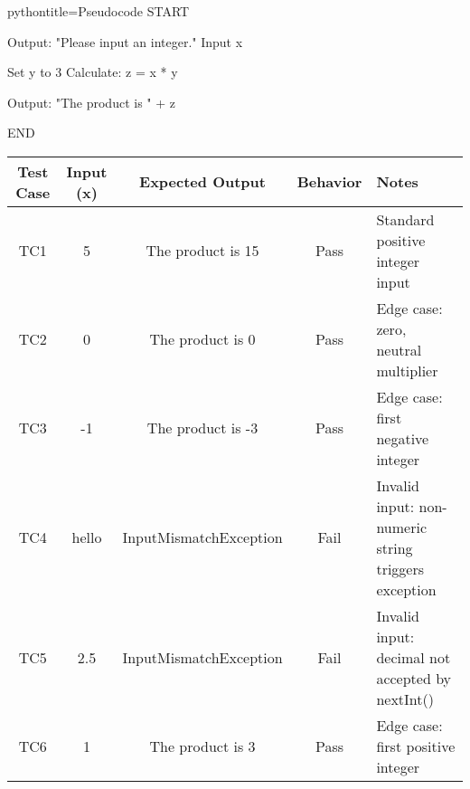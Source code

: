 
\newpage

\begin{NxCodeBox}{python}{title={Pseudocode}}
START

Output: "Please input an integer."
   Input x

Set y to 3
Calculate: z = x * y

Output: "The product is " + z

END
\end{NxCodeBox}
\newpage

\begin{NxLightBox}[title={Test Plan}]
	\begin{tabular}{|c|c|c|c|p{4.3cm}|}
		\hline
		\textbf{Test Case} & \textbf{Input (x)} & \textbf{Expected Output} & \textbf{Behavior} & \textbf{Notes} \\
		\hline
		TC1 & 5 & The product is 15 & Pass & Standard positive integer input \\
		\hline
		TC2 & 0 & The product is 0 & Pass & Edge case: zero, neutral multiplier \\
		\hline
		TC3 & -1 & The product is -3 & Pass & Edge case: first negative integer \\
		\hline
		TC4 & hello & InputMismatchException & Fail & Invalid input: non-numeric string triggers exception \\
		\hline
		TC5 & 2.5 & InputMismatchException & Fail & Invalid input: decimal not accepted by nextInt() \\
		\hline
		TC6 & 1 & The product is 3 & Pass & Edge case: first positive integer \\
		\hline
	\end{tabular}
\end{NxLightBox}

